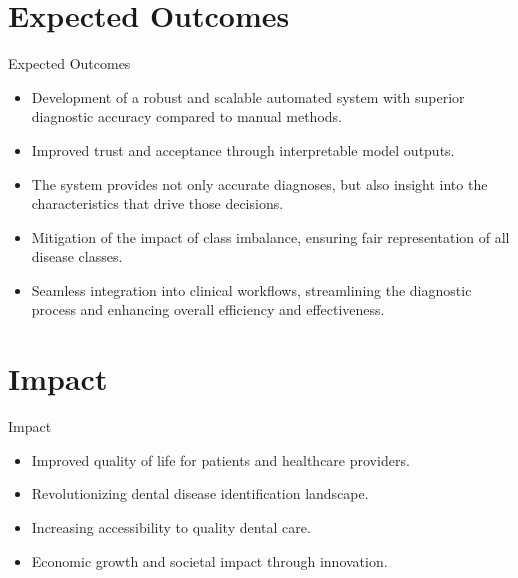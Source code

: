 \documentclass{beamer}
\begin{document}
\section[Expected Outcomes]{Expected Outcomes}

\begin{frame}{Expected Outcomes}
  \begin{itemize}
    \item Development of a robust and scalable automated system with superior diagnostic accuracy compared to manual methods.
    \item Improved trust and acceptance through interpretable model outputs.
    \item The system provides not only accurate diagnoses, but also insight into the characteristics that drive those decisions.
    \item Mitigation of the impact of class imbalance, ensuring fair representation of all disease classes.
    \item Seamless integration into clinical workflows, streamlining the diagnostic process and enhancing overall efficiency and effectiveness.
  \end{itemize}
\end{frame}



\section[Impact]{Impact}

\begin{frame}{Impact}
  \begin{itemize}
    \item Improved quality of life for patients and healthcare providers.
    \item Revolutionizing dental disease identification landscape.
    \item Increasing accessibility to quality dental care.
    \item Economic growth and societal impact through innovation.
  \end{itemize}
\end{frame}
\end{document}
